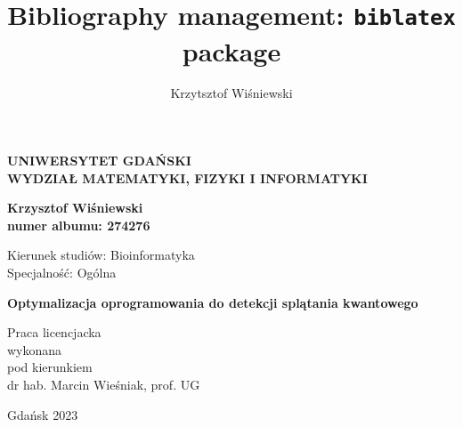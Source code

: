 \documentclass[11pt, a4paper]{article}
\title{Bibliography
management:
\texttt{biblatex}
package}
\author{Krzytsztof
Wiśniewski}
\date{
}
\begin{document}
  \begin{titlepage}
    \centering


    \Large \textbf{UNIWERSYTET GDAŃSKI}\\ \textbf{WYDZIAŁ MATEMATYKI, FIZYKI I
    INFORMATYKI}

    \vspace{2.5cm}


    \large \textbf{Krzysztof Wiśniewski}\\ \textbf{numer albumu: 274276}

    \vspace{1.5cm}
    \raggedright \small Kierunek studiów: Bioinformatyka\\ Specjalność: Ogólna

    \vspace{1.5cm}


    \centering
    \Large \textbf{Optymalizacja oprogramowania do detekcji splątania kwantowego}

    \vfill


    \raggedleft \normalsize Praca licencjacka\\ wykonana\\ pod kierunkiem\\ dr hab. Marcin
    Wieśniak, prof. UG\\

    \vfill


    \centering
    \large Gdańsk 2023
  \end{titlepage}
  \newpage


  \tableofcontents
  \newpage
\end{document}
